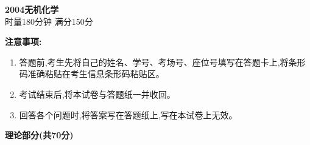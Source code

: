 \begin{center}
    {\LARGE \textbf{2004无机化学}} \\[2ex]
    {\large 时量180分钟 \quad 满分150分}
\end{center}

\vspace{0.5cm}
\noindent\textbf{注意事项:}
\begin{enumerate}[label=\arabic*., parsep=0pt, itemsep=0pt]
    \item 答题前,考生先将自己的姓名、学号、考场号、座位号填写在答题卡上,将条形码准确粘贴在考生信息条形码粘贴区。
    \item 考试结束后,将本试卷与答题纸一并收回。
    \item 回答各个问题时,将答案写在答题纸上,写在本试卷上无效。
\end{enumerate}

\vspace{1cm}
\begin{center}
    {\Large \textbf{理论部分(共70分)}}
\end{center}

